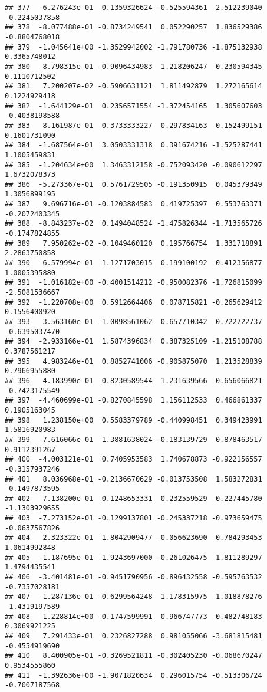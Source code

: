 \documentclass[
]{article}
\begin{document}
\begin{verbatim}
## 377  -6.276243e-01  0.1359326624 -0.525594361  2.512239040 -0.2245037858
## 378  -8.077488e-01 -0.8734249541  0.052290257  1.836529386 -0.8804768018
## 379  -1.045641e+00 -1.3529942002 -1.791780736 -1.875132938  0.3365748012
## 380  -8.798315e-01 -0.9096434983  1.218206247  0.230594345  0.1110712502
## 381   7.200207e-02 -0.5906631121  1.811492879  1.272165614  0.1224929418
## 382  -1.644129e-01  0.2356571554 -1.372454165  1.305607603 -0.4038198588
## 383   8.161987e-01  0.3733333227  0.297834163  0.152499151  0.1601731090
## 384  -1.687564e-01  3.0503331318  0.391674216 -1.525287441  1.1005459831
## 385  -1.204634e+00  1.3463312158 -0.752093420 -0.090612297  1.6732078373
## 386  -5.273367e-01  0.5761729505 -0.191350915  0.045379349  1.3056899195
## 387   9.696716e-01 -0.1203884583  0.419725397  0.553763371 -0.2072403345
## 388  -8.843237e-02  0.1494048524 -1.475826344 -1.713565726 -0.1747824855
## 389   7.950262e-02 -0.1049460120  0.195766754  1.331718891  2.2863750858
## 390  -6.579994e-01  1.1271703015  0.199100192 -0.412356877  1.0005395880
## 391  -1.016182e+00 -0.4001514212 -0.950082376 -1.726815099 -2.5081536667
## 392  -1.220708e+00  0.5912664406  0.078715821 -0.265629412  0.1556400920
## 393   3.563160e-01 -1.0098561062  0.657710342 -0.722722737 -0.6395037470
## 394  -2.933166e-01  1.5874396834  0.387325109 -1.215108788  0.3787561217
## 395   4.983246e-01  0.8852741006 -0.905875070  1.213528839  0.7966955880
## 396   4.183990e-01  0.8230589544  1.231639566  0.656066821 -0.7423175549
## 397  -4.460699e-01 -0.8270845598  1.156112533  0.466861337  0.1905163045
## 398   1.238150e+00  0.5583379789 -0.440998451  0.349423991  1.5816920983
## 399  -7.616066e-01  1.3881638024 -0.183139729 -0.878463517  0.9112391267
## 400  -4.003121e-01  0.7405953583  1.740678873 -0.922156557 -0.3157937246
## 401   8.036968e-01 -0.2136670629 -0.013753508  1.583272831 -0.1497873595
## 402  -7.138200e-01  0.1248653331  0.232559529 -0.227445780 -1.1303929655
## 403  -7.273152e-01 -0.1299137801 -0.245337218 -0.973659475 -0.0637567826
## 404   2.323322e-01  1.8042909477 -0.056623690 -0.784293453  1.0614992848
## 405  -1.187695e-01 -1.9243697000 -0.261026475  1.811289297  1.4794435541
## 406  -3.401481e-01 -0.9451790956 -0.896432558 -0.595763532 -0.7357028181
## 407  -1.287136e-01 -0.6299564248  1.178315975 -1.018878276 -1.4319197589
## 408  -1.228814e+00 -0.1747599991  0.966747773 -0.482748183  0.3069921225
## 409   7.291433e-01  0.2326827288  0.981055066 -3.681815481 -0.4554919690
## 410   8.400905e-01 -0.3269521811 -0.302405230 -0.068670247  0.9534555860
## 411  -1.392636e+00 -1.9071820634  0.296015754 -0.513306724 -0.7007187568

\end{verbatim}
\end{document}
